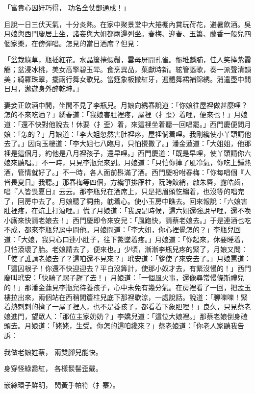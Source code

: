 \begin{showcontents}{}
「富貴心因奸巧得，  功名全仗鄧通成！」

且說一日三伏天氣，十分炎熱。在家中聚景堂中大捲棚內賞玩荷花，避暑飲酒。吳月娘與西門慶居上坐，諸妾與大姐都兩邊列坐。春梅、迎春、玉簫、蘭香一般兒四個家樂，在傍彈唱。怎見的當日酒席？但見：

「盆栽綠草，瓶插紅花。水晶簾捲蝦鬚，雲母屏開孔雀。盤堆麟脯，佳人笑捧紫霞觴；盆浸冰桃，美女高擎碧玉斝。食烹異品，菓獻時新。絃管謳歌，奏一派聲清韻美；綺羅珠翠，擺兩行舞女歌兒。當筵象板撒紅牙，遍體舞裙補錦綉。消遣壺中閒日月，遨遊身外醉乾坤。」

妻妾正飲酒中間，坐間不見了李瓶兒。月娘向綉春說道：「你娘往屋裡做甚麼哩？怎的不來吃酒？」綉春道：「我娘害肚裡疼，屋裡〈扌歪〉着哩，便來也！」月娘道：「還不快對他說去！休要〈扌歪〉着，來這裡坐着聽一回唱罷。」西門慶便問月娘：「怎的？」月娘道：「李大姐忽然害肚裡疼，屋裡倘着哩。我剛纔使小丫頭請他去了。」因向玉樓道：「李大姐七八臨月，只怕攪撒了。」潘金蓮道：「大姐姐，他那裡是這個月，約他是八月裡孩子，還早哩。」西門慶道：「既是早哩，使丫頭請你六娘來聽唱。」不一時，只見李瓶兒來到。月娘道：「只怕你掉了風冷氣，你吃上鍾熱酒，管情就好了。」不一時，各人面前斟滿了酒。西門慶吩咐春梅：「你每唱個『人皆畏夏日』我聽。」那春梅等四個，方纔箏排雁柱，阮跨鮫綃，啟朱唇，露皓齒，唱『人皆畏夏日』云云。那李瓶兒在酒席上，只是把眉頭忔縐着，也沒等的唱完了，回房中去了。月娘聽了詞曲，躭着心。使小玉房中瞧去。回來報說：「六娘害肚裡疼，在炕上打滾哩。」慌了月娘道：「我說是時候，這六姐還強說早哩，還不喚小廝來快請老娘去！」西門慶即令來安兒：「風跑快，請蔡老娘去。」于是連酒也吃不成，都來李瓶兒房中問他。月娘問道：「李大姐，你心裡覺怎的？」李瓶兒回道：「大娘，我只心口連小肚子，往下鱉墜着疼。」月娘道：「你起來，休要睡着，只怕滾壞了胎。老娘請去了，便來也。」少頃，漸漸李瓶兒疼的緊了，月娘又問：「使了誰請老娘去了？這咱還不見來？」玳安道：「爹使了來安去了。」月娘罵道：「這囚根子！你還不快迎迎去？平白沒筭計，使那小奴才去，有緊沒慢的！」西門慶叫玳安：「快騎了騾子趕了去！」月娘道：「一個風火事，還像尋常慢條斯禮兒的！」那潘金蓮見李瓶兒待養孩子，心中未免有幾分氣。在房裡看了一回，把孟玉樓拉出來，兩個站在西稍間簷柱兒底下那裡歇涼，一處說話。說道：「聊嚛嚛！緊着熱剌剌的擠了一屋子裡人，也不是養孩子，都看着下象胆哩！」良久，只見蔡老娘進門，望眾人：「那位主家奶奶？」李嬌兒道：「這位大娘裡。」那蔡老娘倒身磕頭去。月娘道：「姥姥，生受。你怎的這咱纔來？」蔡老娘道：「你老人家聽我告訴：

我做老娘姓蔡，  兩雙腳兒能快。

身穿怪綠喬紅，  各樣䯼髻歪戴。

嵌絲環子鮮明，  閃黃手帕符〈扌寨〉。


\end{showcontents}
